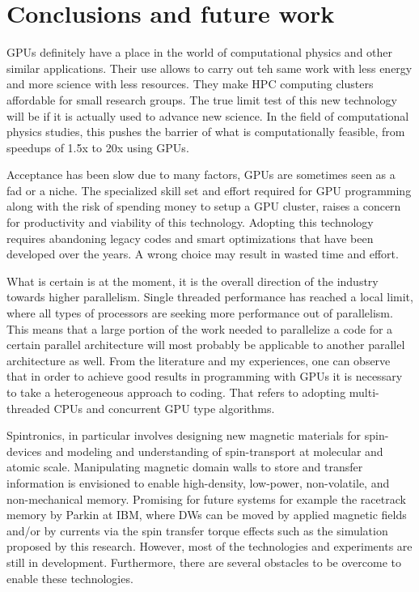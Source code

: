 
\chapter{Conclusions and future work} %

\label{Conclusions and future work} %


GPUs definitely have a place in the world of computational physics and other similar applications. Their use allows to carry out teh same work with less energy and more science with less resources. They make HPC computing clusters affordable for small research groups. The true limit test of this new technology will be if it is actually used to advance new science. In the field of computational physics studies, this pushes the barrier of what is computationally feasible, from speedups of 1.5x to 20x using GPUs\cite{applications}.

Acceptance has been slow due to many factors, GPUs are sometimes seen as a fad or a niche. The specialized skill set and effort required for GPU programming along with the risk of spending money to setup a GPU cluster, raises a concern for productivity and viability of this technology. Adopting this technology requires abandoning legacy codes and smart optimizations that have been developed over the years. A wrong choice may result in wasted time and effort.

What is certain is at the moment, it is the overall direction of the industry towards higher parallelism. Single threaded performance has reached a local limit, where all types of processors are seeking more performance out of parallelism. This means that a large portion of the work needed to parallelize a code for a certain parallel architecture will most probably be applicable to another parallel architecture as well. From the literature and my experiences, one can observe that in order to achieve good results in programming with GPUs it is necessary to take a heterogeneous approach to coding. That refers to adopting multi-threaded CPUs and concurrent GPU type algorithms.

Spintronics, in particular involves designing new magnetic materials for spin-devices and modeling and understanding of spin-transport at molecular and atomic scale. Manipulating magnetic domain walls to store and transfer information is envisioned to enable high-density, low-power, non-volatile, and non-mechanical memory. Promising for future systems for example the racetrack memory by Parkin at IBM, where DWs can be moved by applied magnetic fields and/or by currents via the spin transfer torque effects such as the simulation proposed by this research. However, most of the technologies and experiments  are still in development. Furthermore, there are several obstacles to be overcome to enable these technologies.


